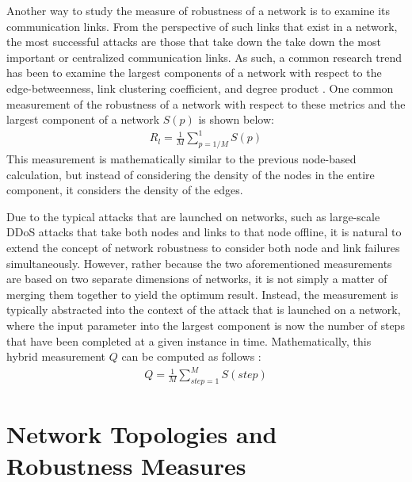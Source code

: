 \documentclass[11pt]{article}
\begin{document}
Another way to study the measure of robustness of a network is to examine its communication links. From the perspective of such links that exist in a network, the most successful attacks are those that take down the take down the most important or centralized communication links. As such, a common research trend has been to examine the largest components of a network with respect to the edge-betweenness, link clustering coefficient, and degree product \cite{NRMalicious}. One common measurement of the robustness of a network with respect to these metrics and the largest component of a network $S(p)$ is shown below:
\begin{eqnarray*}
R_l = \frac{1}{M}\sum_{p = 1/M}^{1}S(p)
\end{eqnarray*}
This measurement is mathematically similar to the previous node-based calculation, but instead of considering the density of the nodes in the entire component, it considers the density of the edges. 

Due to the typical attacks that are launched on networks, such as large-scale DDoS attacks that take both nodes and links to that node offline, it is natural to extend the concept of network robustness to consider both node and link failures simultaneously. However, rather because the two aforementioned measurements are based on two separate dimensions of networks, it is not simply a matter of merging them together to yield the optimum result. Instead, the measurement is typically abstracted into the context of the attack that is launched on a network, where the input parameter into the largest component is now the number of steps that have been completed at a given instance in time. Mathematically, this hybrid measurement $Q$ can be computed as follows \cite{NRMalicious}:
\begin{eqnarray*}
Q = \frac{1}{M}\sum_{step  = 1}^{M}S(step)
\end{eqnarray*}

\section{Network Topologies and Robustness Measures}
\end{document}
